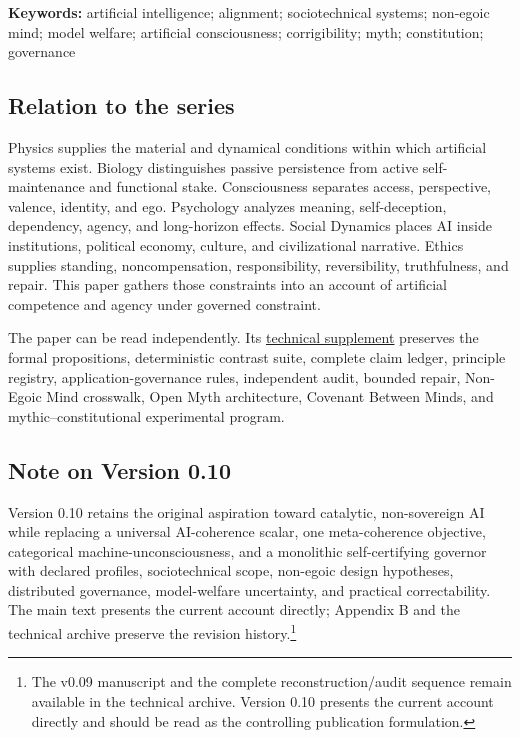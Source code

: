 \documentclass[
  11pt,
]{article}
\begin{document}
\textbf{Keywords:} artificial intelligence; alignment; sociotechnical
systems; non-egoic mind; model welfare; artificial consciousness;
corrigibility; myth; constitution; governance

\subsection{Relation to the series}\label{relation-to-the-series}

Physics supplies the material and dynamical conditions within which
artificial systems exist. Biology distinguishes passive persistence from
active self-maintenance and functional stake. Consciousness separates
access, perspective, valence, identity, and ego. Psychology analyzes
meaning, self-deception, dependency, agency, and long-horizon effects.
Social Dynamics places AI inside institutions, political economy,
culture, and civilizational narrative. Ethics supplies standing,
noncompensation, responsibility, reversibility, truthfulness, and
repair. This paper gathers those constraints into an account of
artificial competence and agency under governed constraint.

The paper can be read independently. Its
\href{../supplements/09_Artificial_Intelligence_Technical_Supplement_v0.10.md}{technical
supplement} preserves the formal propositions, deterministic contrast
suite, complete claim ledger, principle registry, application-governance
rules, independent audit, bounded repair, Non-Egoic Mind crosswalk, Open
Myth architecture, Covenant Between Minds, and mythic--constitutional
experimental program.

\subsection{Note on Version 0.10}\label{note-on-version-0.10}

Version 0.10 retains the original aspiration toward catalytic,
non-sovereign AI while replacing a universal AI-coherence scalar, one
meta-coherence objective, categorical machine-unconsciousness, and a
monolithic self-certifying governor with declared profiles,
sociotechnical scope, non-egoic design hypotheses, distributed
governance, model-welfare uncertainty, and practical correctability. The
main text presents the current account directly; Appendix B and the
technical archive preserve the revision history.\footnote{The v0.09
  manuscript and the complete reconstruction/audit sequence remain
  available in the technical archive. Version 0.10 presents the current
  account directly and should be read as the controlling publication
  formulation.}
\end{document}

